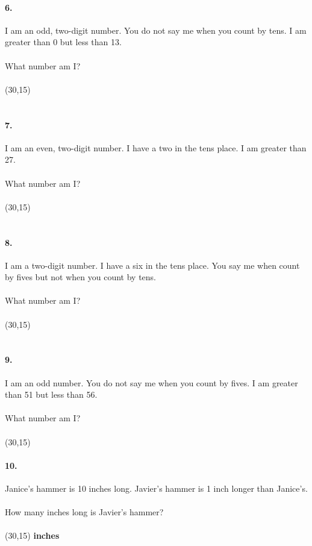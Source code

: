 \documentclass[12pt]{article}
\begin{document}
\newpage

\paragraph{6.}
I am an odd, two-digit number. You do not say me when you count by tens. I am greater than 0 but less than 13.
\\
\\
What number am I?
\\
\\
\framebox(30,15){}
\\
\\
\paragraph{7.}
I am an even, two-digit number. I have a two in the tens place. I am greater than 27.
\\
\\
What number am I?
\\
\\
\framebox(30,15){}
\\
\\
\paragraph{8.}
I am a two-digit number. I have a six in the tens place. You say me when count by fives but not when you count by tens.
\\
\\
What number am I?
\\
\\
\framebox(30,15){}
\\
\\
\paragraph{9.}
I am an odd number. You do not say me when you count by fives. I am greater than 51 but less than 56.
\\
\\
What number am I?
\\
\\
\framebox(30,15){}

\newpage

\paragraph{10.}
Janice's hammer is 10 inches long. Javier's hammer is 1 inch longer than Janice's.
\\
\\
How many inches long is Javier's hammer?
\\
\\
\framebox(30,15){} \textbf{inches}
\\
\\
\end{document}
